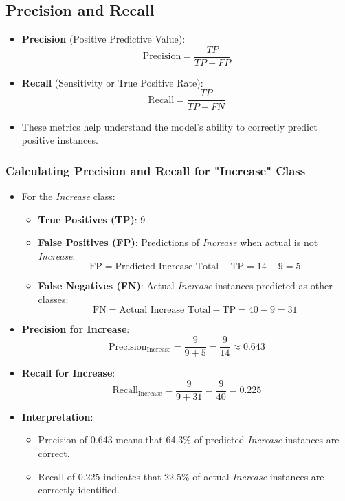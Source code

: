 \documentclass{article}
\begin{document}
\subsection{Precision and Recall}

\begin{itemize}
    \item \textbf{Precision} (Positive Predictive Value):
    \[
    \text{Precision} = \frac{TP}{TP + FP}
    \]
    \item \textbf{Recall} (Sensitivity or True Positive Rate):
    \[
    \text{Recall} = \frac{TP}{TP + FN}
    \]
    \item These metrics help understand the model's ability to correctly predict positive instances.
\end{itemize}

\subsubsection{Calculating Precision and Recall for "Increase" Class}

\begin{itemize}
    \item For the \textit{Increase} class:
    \begin{itemize}
        \item \textbf{True Positives (TP)}: 9
        \item \textbf{False Positives (FP)}: Predictions of \textit{Increase} when actual is not \textit{Increase}:
        \[
        \text{FP} = \text{Predicted Increase Total} - \text{TP} = 14 - 9 = 5
        \]
        \item \textbf{False Negatives (FN)}: Actual \textit{Increase} instances predicted as other classes:
        \[
        \text{FN} = \text{Actual Increase Total} - \text{TP} = 40 - 9 = 31
        \]
    \end{itemize}
    \item \textbf{Precision for Increase}:
    \[
    \text{Precision}_{\text{Increase}} = \frac{9}{9 + 5} = \frac{9}{14} \approx 0.643
    \]
    \item \textbf{Recall for Increase}:
    \[
    \text{Recall}_{\text{Increase}} = \frac{9}{9 + 31} = \frac{9}{40} = 0.225
    \]
    \item \textbf{Interpretation}:
    \begin{itemize}
        \item Precision of 0.643 means that 64.3\% of predicted \textit{Increase} instances are correct.
        \item Recall of 0.225 indicates that 22.5\% of actual \textit{Increase} instances are correctly identified.
    \end{itemize}
\end{itemize}
\end{document}
